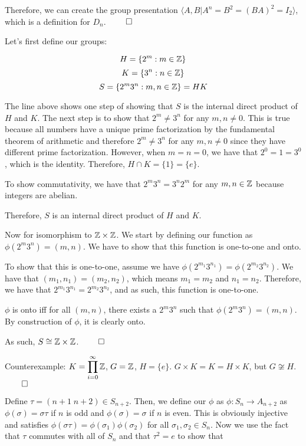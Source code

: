 \documentclass[12pt]{report}
\begin{document}
Therefore, we can create the group presentation $ \langle A, B | A^n = B^2 = (BA)^2= I_2 \rangle$, which is a definition for $D_n$. $\qed$ 

\sol Let's first define our groups:

$$H = \{2^m : m \in \ZZ\}$$
$$K = \{3^n : n \in \ZZ\}$$
$$S = \{2^m3^n : m, n \in \ZZ\} = HK$$

The line above shows one step of showing that $S$ is the internal direct product of $H$ and $K$. The next step is to show that $2^m \neq 3^n$ for any $m, n \neq 0$. This is true because all numbers have a unique prime factorization by the fundamental theorem of arithmetic and therefore $2^m \neq 3^n$ for any $m, n \neq 0$ since they have different prime factorization. However, when $m = n = 0$, we have that $2^0 = 1 = 3^0$, which is the identity. Therefore, $H \cap K = \{1\} = \{e\}$.

To show commutativity, we have that $2^m3^n = 3^n2^m$ for any $m, n \in \ZZ$ because integers are abelian. 

Therefore, $S$ is an internal direct product of $H$ and $K$.

Now for isomorphism to $\ZZ \times \ZZ$. We start by defining our function as $\phi(2^m3^n) = (m, n)$. We have to show that this function is one-to-one and onto. 

To show that this is one-to-one, assume we have $\phi(2^{m_1}3^{n_1}) = \phi(2^{m_2}3^{n_2})$. We have that $(m_1, n_1) = (m_2, n_2)$, which means $m_1 = m_2$ and $n_1 = n_2$. Therefore, we have that $2^{m_1}3^{n_1} = 2^{m_2}3^{n_2}$, and as such, this function is one-to-one.

$\phi$ is onto iff for all $(m, n)$, there exists a $2^m3^n$ such that $\phi(2^m3^n) = (m, n)$. By construction of $\phi$, it is clearly onto. 

As such, $S \cong \ZZ \times \ZZ$. $\qed$

\sol Counterexample: $K = \displaystyle \prod_{i=0}^\infty \ZZ$, $G = \ZZ$, $H = \{e\}$. $G \times K = K = H \times K$, but $G \not\cong H$. $\qed$

\sol Define $\tau = (n+1 \; n+2) \in S_{n+2}$. Then, we define our $\phi$ as $\phi : S_n \to A_{n+2}$ as $\phi(\sigma) = \sigma \tau$ if $n$ is odd and $\phi(\sigma) = \sigma$ if $n$ is even. This is obviously injective and satisfies $\phi(\sigma\tau) = \phi(\sigma_1)\phi(\sigma_2)$ for all $\sigma_1, \sigma_2 \in S_n$. Now we use the fact that $\tau$ commutes with all of $S_n$ and that $\tau^2 = e$ to show that 
\end{document}

